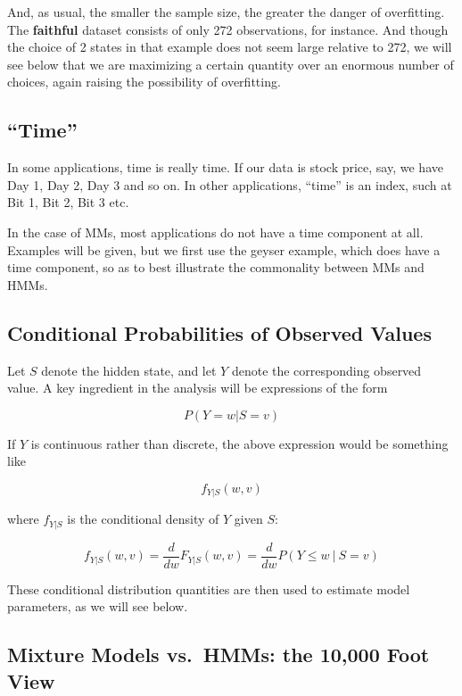 \documentclass[11pt]{article}
\begin{document}
And, as usual, the smaller the sample size, the greater the danger of
overfitting.  The \textbf{faithful} dataset consists of only 272
observations, for instance.  And though the choice of 2 states in that
example does not seem large relative to 272, we will see below that we
are maximizing a certain quantity over an enormous number of choices,
again raising the possibility of overfitting.

\subsection{``Time''}

In some applications, time is really time.  If our data is stock price,
say, we have Day 1, Day 2, Day 3 and so on.  In other applications,
``time'' is an index, such at Bit 1, Bit 2, Bit 3 etc.

In the case of MMs, most applications do not have a time component at
all.  Examples will be given, but we first use the geyser example, which does
have a time component, so as to best illustrate the commonality between
MMs and HMMs.

\subsection{Conditional Probabilities of Observed Values}

Let $S$ denote the hidden state, and let $Y$ denote the corresponding
observed value.  A key ingredient in the analysis will be expressions of
the form

\begin{equation}
P(Y = w | S  = v)
\end{equation}

If $Y$ is continuous rather than discrete, the above expression would be
something like

\begin{equation}
f_{Y|S} (w,v) 
\end{equation}

where $f_{Y|S}$ is the conditional density of $Y$ given $S$:

\begin{equation}
f_{Y|S}(w,v) 
= \frac{d}{dw} F_{Y|S}(w,v) 
= \frac{d}{dw} P(Y \leq w ~|~ S = v)
\end{equation}

These conditional distribution quantities are then used to estimate
model parameters, as we will see below.

\subsection{Mixture Models vs.\ HMMs: the 10,000 Foot View}
\end{document}
